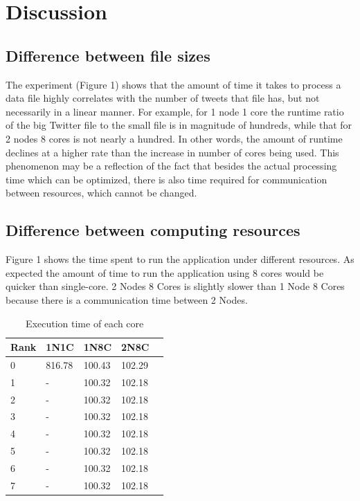 \documentclass[11pt]{article}
\begin{document}
\section{Discussion}
\subsection{Difference between file sizes}
The experiment (Figure 1) shows that the amount of time it takes to process a data file highly correlates with the number of tweets that file has, but not necessarily in a linear manner. For example, for 1 node 1 core the runtime ratio of the big Twitter file to the small file is in magnitude of hundreds, while that for 2 nodes 8 cores is not nearly a hundred. In other words, the amount of runtime declines at a higher rate than the increase in number of cores being used. This phenomenon may be a reflection of the fact that besides the actual processing time which can be optimized, there is also time required for communication between resources, which cannot be changed.

\subsection{Difference between computing resources}

Figure 1 shows the time spent to run the application under different resources. As expected the amount of time to run the application using 8 cores would be quicker than single-core. 2 Nodes 8 Cores is slightly slower than 1 Node 8 Cores because there is a communication time between 2 Nodes. 
\newpage

\begin{table}[h]
 \begin{center}
\begin{tabular}{|l|l|l|l|l|}

      \hline
      Rank &1N1C & 1N8C & 2N8C  \\
      \hline\hline
      0 & 816.78 & 100.43 & 102.29 \\
      1 & - & 100.32 & 102.18 \\
      2 & - & 100.32 & 102.18 \\
      3 & - & 100.32 & 102.18 \\
      4 & - & 100.32 & 102.18 \\
      5 & - & 100.32 & 102.18 \\
      6 & - & 100.32 & 102.18 \\
      7 & - & 100.32 & 102.18 \\

     \hline

\end{tabular}
\caption{Execution time of each core}\label{table2}
 \end{center}
\end{table}
\end{document}
